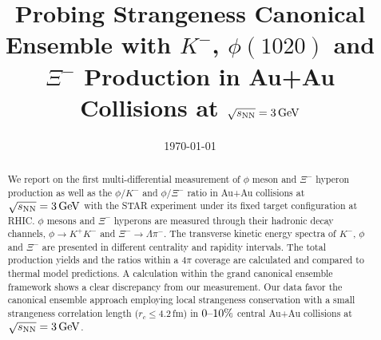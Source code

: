 \documentclass[%
 reprint,	
showpacs,
 amsmath,amssymb,
 aps,
 superscriptaddress,
]{revtex4-1}
\begin{document}

\title{Probing Strangeness Canonical Ensemble with $K^{-}$, $\phi(1020)$ and $\Xi^{-}$ Production in Au+Au Collisions at ${\sqrt{s_{\rm NN}} = \rm{3\,GeV}}$}%



\date{\today}%

\begin{abstract}


We report on the first multi-differential measurement of $\phi$ meson and $\Xi^{-}$ hyperon production as well as the $\phi/K^-$ and $\phi/\Xi^-$ ratio in Au+Au collisions at ${\sqrt{s_{\rm NN}} = \rm{3\,GeV}}$ with the STAR experiment under its fixed target configuration at RHIC. $\phi$ mesons and $\Xi^{-}$ hyperons are measured through their hadronic decay channels, $\phi\rightarrow K^+K^-$ and $\Xi^-\rightarrow \Lambda\pi^-$. The transverse kinetic energy spectra of $K^-$, $\phi$ and $\Xi^{-}$ are presented in different centrality and rapidity intervals. The total production yields and the ratios within a $4\pi$ coverage are calculated and compared to thermal model predictions. A calculation within the grand canonical ensemble framework shows a clear discrepancy from our measurement. Our data favor the canonical ensemble approach employing local strangeness conservation with a small strangeness correlation length ($r_c \leq 4.2$\,fm) in $\textup{0--10\%}$ central Au+Au collisions at ${\sqrt{s_{\rm NN}} = \rm{3\,GeV}}$.


\end{abstract}
\end{document}

